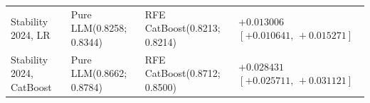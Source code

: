 \documentclass[final,5p,twocolumn]{elsarticle}
\begin{document}
\begin{table}[htbp]
\begin{threeparttable}
\begin{tabular}{@{}L{24mm}L{30mm}L{27mm}L{38mm}@{}}
\addlinespace
Stability 2024, LR & Pure LLM\newline (0.8258; 0.8344) & RFE CatBoost\newline (0.8213; 0.8214) & $+0.013006$\newline $[+0.010641,\,+0.015271]$ \\
\addlinespace
Stability 2024, CatBoost & Pure LLM\newline (0.8662; 0.8784) & RFE CatBoost\newline (0.8712; 0.8500) & $+0.028431$\newline $[+0.025711,\,+0.031121]$ \\
\bottomrule
\end{tabular}
\end{threeparttable}
\end{table}
\end{document}
